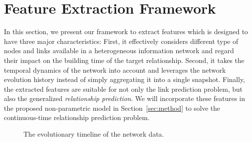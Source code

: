 \section{Feature Extraction Framework}\label{sec:features}

In this section, we present our framework to extract features which is designed to have three major characteristics: First, it effectively considers different type of nodes and links available in a heterogeneous information network and regard their impact on the building time of the target relationship. Second, it takes the temporal dynamics of the network into account and leverages the network evolution history instead of simply aggregating it into a single snapshot. Finally, the extracted features are suitable for not only the link prediction problem, but also the generalized \emph{relationship prediction}. We will incorporate these features in the proposed non-parametric model in Section~\ref{sec:method} to solve the continuous-time relationship prediction problem.

\begin{figure}
	\begin{chronology}[align=left, startyear=0,stopyear=200, width=\columnwidth, height=1pt, startdate=false, stopdate=false, arrowwidth=4pt, arrowheight=3pt]
		\scriptsize
	\end{chronology}
	\caption{The evolutionary timeline of the network data.}
	\label{fig:timeline}
\end{figure}

